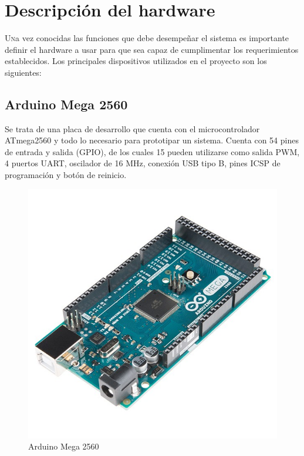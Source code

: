 \chapter{Descripción del hardware}\label{chp-02}

\lettrine[lraise=-0.1, lines=2, loversize=0.2]{U}na vez conocidas las funciones
que debe desempeñar el sistema es importante definir el hardware a usar para que
sea capaz de cumplimentar los requerimientos establecidos. Los principales dispositivos
utilizados en el proyecto son los siguientes:

\section{Arduino Mega 2560}

Se trata de una placa de desarrollo que cuenta con el microcontrolador ATmega2560 y todo lo
necesario para prototipar un sistema. Cuenta con 54 pines de entrada y salida (GPIO), de los cuales
15 pueden utilizarse como salida PWM, 4 puertos UART, oscilador de 16 MHz, conexión USB tipo B,
pines ICSP de programación y botón de reinicio.

\begin{figure}[hbtp]
	\centering
	\includegraphics[scale=0.5]{02-hardware/01-arduino-mega-2560.jpg}
	\caption{Arduino Mega 2560}
	\label{fig:figura2}
	\end{figure}



